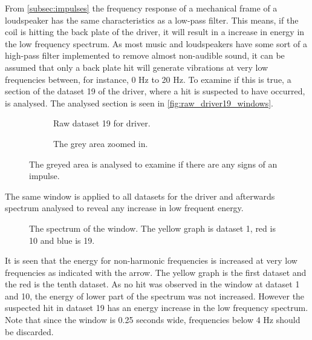 From \autoref{subsec:impulses} the frequency response of a mechanical frame of a loudspeaker has the same characteristics as a low-pass filter. This means, if the coil is hitting the back plate of the driver, it will result in a increase in energy in the low frequency spectrum. As most music and loudspeakers have some sort of a high-pass filter implemented to remove almost non-audible sound, it can be assumed that only a back plate hit will generate vibrations at very low frequencies between, for instance, 0 Hz to 20 Hz. To examine if this is true, a section of the dataset 19 of the driver, where a hit is suspected to have occurred, is analysed. The analysed section is seen in \autoref{fig:raw_driver19_windows}.


\begin{figure}[H]
\centering
\begin{subfigure}[t]{0.55\textwidth}
	
	\caption{Raw dataset 19 for driver.}
	\label{fig:raw_driver19_window}
\end{subfigure}
\begin{subfigure}[t]{0.43\textwidth}
	
	\caption{The grey area zoomed in.}
	\label{fig:raw_driver19_window_zoom}
\end{subfigure}
\caption{The greyed area is analysed to examine if there are any signs of an impulse.}
\label{fig:raw_driver19_windows}
\end{figure}

The same window is applied to all datasets for the driver and afterwards spectrum analysed to reveal any increase in low frequent energy. 

\begin{figure}[H]
\centering
{}

\caption{The spectrum of the window. The yellow graph is dataset 1, red is 10 and blue is 19.}
\label{fig:FFT_hit}
\end{figure}

It is seen that the energy for non-harmonic frequencies is increased at very low frequencies as indicated with the arrow. The yellow graph is the first dataset and the red is the tenth dataset. As no hit was observed in the window at dataset 1 and 10, the energy of lower part of the spectrum was not increased. However the suspected hit in dataset 19 has an energy increase in the low frequency spectrum. Note that since the window is 0.25 seconds wide, frequencies below 4 Hz should be discarded.

